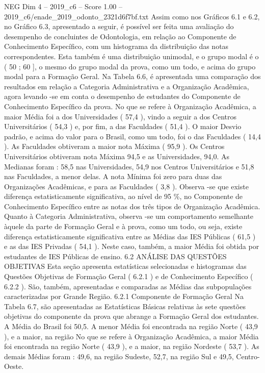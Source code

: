 \begin{textsample}{NEG Dim 4 – 2019\_c6 – Score 1.00 – 2019\_c6/enade\_2019\_odonto\_2321d6f7bf.txt}
Assim como nos Gráficos 6.1 e 6.2, no Gráfico 6.3, apresentado a seguir, é possível ser feita uma avaliação do desempenho de concluintes de Odontologia, em relação ao Componente de Conhecimento Específico, com um histograma da distribuição das notas correspondentes.
Esta também é uma distribuição unimodal, e o grupo modal é o ( 50 ; 60 ], o mesmo do grupo modal da prova, como um todo, e acima do grupo modal para a Formação Geral.
Na Tabela 6.6, é apresentada uma comparação dos resultados em relação a Categoria Administrativa e a Organização Acadêmica, agora levando -se em conta o desempenho de estudantes do Componente de Conhecimento Específico da prova.
No que se refere à Organização Acadêmica, a maior Média foi a dos Universidades ( 57,4 ), vindo a seguir a dos Centros Universitários ( 54,3 ) e, por fim, a das Faculdades ( 51,4 ).
O maior Desvio padrão, e acima do valor para o Brasil, como um todo, foi o das Faculdades ( 14,4 ).
As Faculdades obtiveram a maior nota Máxima ( 95,9 ).
Os Centros Universitários obtiveram nota Máxima 94,5 e as Universidades, 94,0.
As Medianas foram : 58,5 nas Universidades, 54,9 nos Centros Universitários e 51,8 nas Faculdades, a menor delas.
A nota Mínima foi zero para duas das Organizações Acadêmicas, e para as Faculdades ( 3,8 ).
Observa -se que existe diferença estatisticamente significativa, ao nível de 95 \%, no Componente de Conhecimento Específico entre as notas dos três tipos de Organização Acadêmica.
Quanto à Categoria Administrativa, observa -se um comportamento semelhante àquele da parte de Formação Geral e à prova, como um todo, ou seja, existe diferença estatisticamente significativa entre as Médias das IES Públicas ( 61,5 ) e as das IES Privadas ( 54,1 ).
Neste caso, também, a maior Média foi obtida por estudantes de IES Públicas de ensino. 6.2 ANÁLISE DAS QUESTÕES OBJETIVAS Esta seção apresenta estatísticas selecionadas e histogramas das Questões Objetivas de Formação Geral ( 6.2.1 ) e de Conhecimento Específico ( 6.2.2 ).
São, também, apresentadas e comparadas as Médias das subpopulações caracterizadas por Grande Região. 6.2.1 Componente de Formação Geral Na Tabela 6.7, são apresentadas as Estatísticas Básicas relativas às sete questões objetivas do componente da prova que abrange a Formação Geral dos estudantes.
A Média do Brasil foi 50,5.
A menor Média foi encontrada na região Norte ( 43,9 ), e a maior, na região No que se refere à Organização Acadêmica, a maior Média foi encontrada na região Norte ( 43,9 ), e a maior, na região Nordeste ( 53,7 ).
As demais Médias foram : 49,6, na região Sudeste, 52,7, na região Sul e 49,5, Centro-Oeste.

\end{textsample}
